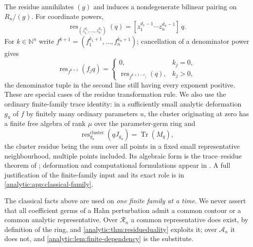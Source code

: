 \documentclass[11pt,letterpaper]{article}
\theoremstyle{definition}
\theoremstyle{remark}
\newcommand{\N}{\mathbb N}
\newcommand{\A}{\mathscr A}
\newcommand{\RR}{\mathscr R}
\newcommand{\res}{\operatorname{res}}
\newcommand{\Tr}{\operatorname{Tr}}
\numberwithin{equation}{section}
\begin{document}
The residue annihilates $(g)$ and induces a nondegenerate bilinear pairing
on $R_n/(g)$. For coordinate powers,
\begin{equation}\label{analytic:eq:coordinate-residue}
 \res_{(z_1^{d_1},\ldots,z_n^{d_n})}(q)=[z_1^{d_1-1}\cdots z_n^{d_n-1}]\,q .
\end{equation}
For $k\in\N^n$ write $f^{k+1}=(f_1^{k_1+1},\ldots,f_n^{k_n+1})$;
cancellation of a denominator power gives
\begin{equation}\label{analytic:eq:pole-cancel}
 \res_{f^{k+1}}(f_jq)=
 \begin{cases}
 0,&k_j=0,\\
 \res_{f^{k+1-e_j}}(q),&k_j>0,
 \end{cases}
\end{equation}
the denominator tuple in the second line still having every exponent
positive. These are special cases of the residue transformation rule. We
also use the ordinary finite-family trace identity: in a sufficiently small
analytic deformation $g_u$ of $f$ by finitely many ordinary parameters $u$,
the cluster originating at zero has a finite free algebra of rank $\mu$ over
the parameter-germ ring and
\begin{equation}\label{analytic:eq:ordinary-trace}
 \res^{\mathrm{cluster}}_{g_u}(qJ_{g_u})=\Tr(M_q),
\end{equation}
the cluster residue being the sum over all points in a fixed small
representative neighbourhood, multiple points included. Its algebraic form
is the trace--residue theorem of \cite{SS}; deformation and computational
formulations appear in \cite{KW,CDS}. A full justification of the
finite-family input and its exact role is in
\cref{analytic:app:classical-family}.

The classical facts above are used on \emph{one finite family at a time}.
We never assert that all coefficient germs of a Hahn perturbation admit a
common contour or a common analytic representative. Over $\RR_n$ a common
representative does exist, by definition of the ring, and
\cref{analytic:thm:residueduality} exploits it; over $\A_n$ it does not, and
\cref{analytic:lem:finite-dependency} is the substitute.
\end{document}
